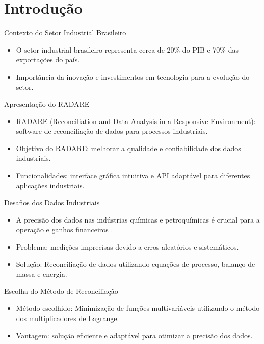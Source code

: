 \section{Introdução}

\begin{frame}{Contexto do Setor Industrial Brasileiro}
    \begin{itemize}
        \item O setor industrial brasileiro representa cerca de 20\% do PIB e 70\% das exportações do país.
        \item Importância da inovação e investimentos em tecnologia para a evolução do setor.
    \end{itemize}
\end{frame}

\begin{frame}{Apresentação do RADARE}
    \begin{itemize}
        \item RADARE (Reconciliation and Data Analysis in a Responsive Environment): software de reconciliação de dados para processos industriais.
        \item Objetivo do RADARE: melhorar a qualidade e confiabilidade dos dados industriais.
        \item Funcionalidades: interface gráfica intuitiva e API adaptável para diferentes aplicações industriais.
    \end{itemize}
\end{frame}

\begin{frame}{Desafios dos Dados Industriais}
    \begin{itemize}
        \item A precisão dos dados nas indústrias químicas e petroquímicas é crucial para a operação e ganhos financeiros \cite{datarecshakar}.
        \item Problema: medições imprecisas devido a erros aleatórios e sistemáticos.
        \item Solução: Reconciliação de dados utilizando equações de processo, balanço de massa e energia.
    \end{itemize}
\end{frame}

\begin{frame}{Escolha do Método de Reconciliação}
    \begin{itemize}
        \item Método escolhido: Minimização de funções multivariáveis utilizando o método dos multiplicadores de Lagrange.
        \item Vantagem: solução eficiente e adaptável para otimizar a precisão dos dados.
    \end{itemize}
\end{frame}

